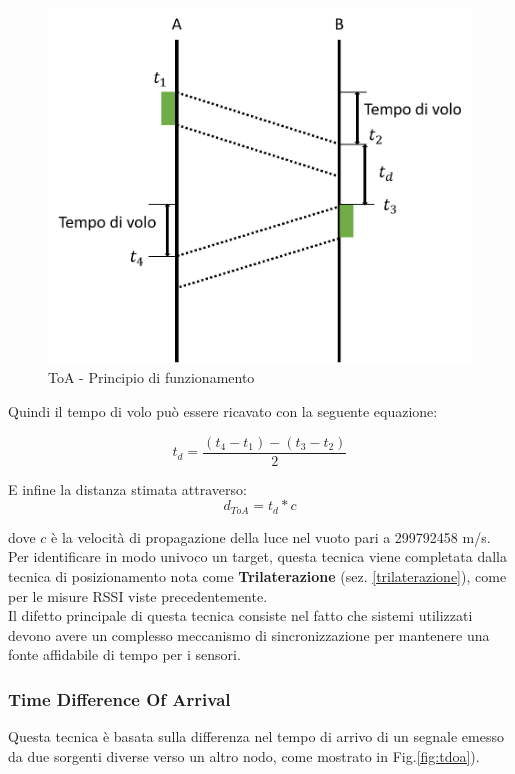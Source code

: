 \begin{figure}[H]  
	\centering 
	\includegraphics[scale=0.4]{ContestoApplicativo/toa.png}
	\caption{ToA - Principio di funzionamento}
	\label{fig:toa}
\end{figure}

Quindi il tempo di volo può essere ricavato con la seguente equazione:

\begin{equation}
t_d = \dfrac{(t_4 - t_1) - (t_3 - t_2)}{2}
\label{td}
\end{equation}

E infine la distanza stimata attraverso:
\begin{equation}
d_{ToA} = t_d * c
\label{eq:toa}
\end{equation}

dove $c$ è la velocità di propagazione della luce nel vuoto pari a 299792458 m/s. Per identificare in modo univoco un target, questa tecnica viene completata dalla tecnica di posizionamento nota come \textbf{Trilaterazione} (sez. \ref{trilaterazione}), come per le misure RSSI viste precedentemente.\\
Il difetto principale di questa tecnica consiste nel fatto che sistemi utilizzati devono avere un complesso meccanismo di sincronizzazione per mantenere una fonte affidabile di tempo per i sensori\cite{toaProblem}.

\subsubsection{Time Difference Of Arrival}
\label{tdoa}
Questa tecnica è basata sulla differenza nel tempo di arrivo di un segnale emesso da due sorgenti diverse verso un altro nodo, come mostrato in Fig.\ref{fig:tdoa}).


